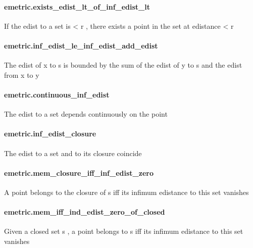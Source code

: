 \documentclass{article}
\begin{document}
\paragraph{emetric.exists\_edist\_lt\_of\_inf\_edist\_lt}
\par
If the edist to a set is 
\colorbox[RGB]{253,246,227}{{{{\color[RGB]{181, 137, 0} < }}}{{{\color[RGB]{101, 123, 131}  r }}}}, there exists a point in the set at edistance 
\colorbox[RGB]{253,246,227}{{{{\color[RGB]{181, 137, 0} < }}}{{{\color[RGB]{101, 123, 131}  r }}}}\paragraph{emetric.inf\_edist\_le\_inf\_edist\_add\_edist}
\par
The edist of 
\colorbox[RGB]{253,246,227}{{{{\color[RGB]{101, 123, 131} x }}}} to 
\colorbox[RGB]{253,246,227}{{{{\color[RGB]{101, 123, 131} s }}}} is bounded by the sum of the edist of 
\colorbox[RGB]{253,246,227}{{{{\color[RGB]{101, 123, 131} y }}}} to 
\colorbox[RGB]{253,246,227}{{{{\color[RGB]{101, 123, 131} s }}}} and
the edist from 
\colorbox[RGB]{253,246,227}{{{{\color[RGB]{101, 123, 131} x }}}} to 
\colorbox[RGB]{253,246,227}{{{{\color[RGB]{101, 123, 131} y }}}}\paragraph{emetric.continuous\_inf\_edist}
\par
The edist to a set depends continuously on the point
\paragraph{emetric.inf\_edist\_closure}
\par
The edist to a set and to its closure coincide
\paragraph{emetric.mem\_closure\_iff\_inf\_edist\_zero}
\par
A point belongs to the closure of 
\colorbox[RGB]{253,246,227}{{{{\color[RGB]{101, 123, 131} s }}}} iff its infimum edistance to this set vanishes
\paragraph{emetric.mem\_iff\_ind\_edist\_zero\_of\_closed}
\par
Given a closed set 
\colorbox[RGB]{253,246,227}{{{{\color[RGB]{101, 123, 131} s }}}}, a point belongs to 
\colorbox[RGB]{253,246,227}{{{{\color[RGB]{101, 123, 131} s }}}} iff its infimum edistance to this set vanishes
\end{document}
